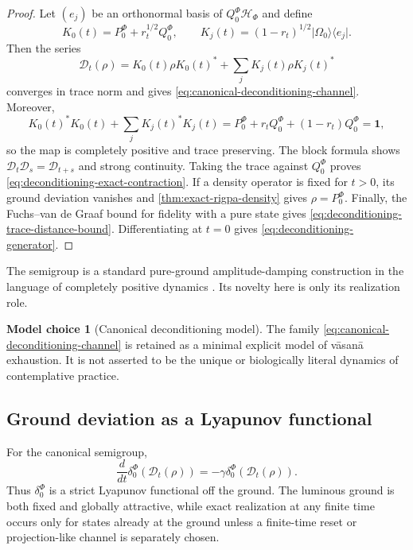 \documentclass[11pt,reqno]{scrartcl}
\newcommand{\scrHF}{\mathscr H_{\Phi}}
\newcommand{\PzeroF}{P_{0}^{\Phi}}
\newcommand{\QzeroF}{Q_{0}^{\Phi}}
\newcommand{\idop}{\mathbf 1}
\newcommand{\ket}[1]{\lvert #1\rangle}
\newcommand{\bra}[1]{\langle #1\rvert}
\theoremstyle{plain}
\theoremstyle{definition}
\newtheorem{modelchoice}[modelchoice]{Model choice}
\theoremstyle{remark}
\begin{document}
\begin{proof}
Let $(e_j)$ be an orthonormal basis of $\QzeroF\scrHF$ and define
\begin{equation}
  K_0(t)=\PzeroF+r_t^{1/2}\QzeroF,
  \qquad
  K_j(t)=(1-r_t)^{1/2}\ket{\Omega_0}\bra{e_j}.
\end{equation}
Then the series
\begin{equation}
  \mathcal D_t(\rho)
  =K_0(t)\rho K_0(t)^*
   +\sum_j K_j(t)\rho K_j(t)^*
\end{equation}
converges in trace norm and gives
\eqref{eq:canonical-deconditioning-channel}.  Moreover,
\begin{equation}
  K_0(t)^*K_0(t)+\sum_jK_j(t)^*K_j(t)
  =\PzeroF+r_t\QzeroF+(1-r_t)\QzeroF=\idop,
\end{equation}
so the map is completely positive and trace preserving.  The block formula
shows $\mathcal D_t\mathcal D_s=\mathcal D_{t+s}$ and strong continuity.
Taking the trace against $\QzeroF$ proves
\eqref{eq:deconditioning-exact-contraction}.  If a density operator is fixed
for $t>0$, its ground deviation vanishes and
\cref{thm:exact-rigpa-density} gives $\rho=\PzeroF$.  Finally, the
Fuchs--van de Graaf bound for fidelity with a pure state gives
\eqref{eq:deconditioning-trace-distance-bound}.  Differentiating at $t=0$
gives \eqref{eq:deconditioning-generator}.
\end{proof}

The semigroup is a standard pure-ground amplitude-damping construction in the
language of completely positive dynamics
\cite{GKS1976,Lindblad1976,FuchsVandeGraaf1999}.  Its novelty here is only its
realization role.

\begin{modelchoice}[Canonical deconditioning model]
\label{choice:canonical-deconditioning-model}
The family \eqref{eq:canonical-deconditioning-channel} is retained as a
minimal explicit model of v\=asan\=a exhaustion.  It is not asserted to be the
unique or biologically literal dynamics of contemplative practice.
\end{modelchoice}

\subsection{Ground deviation as a Lyapunov functional}

For the canonical semigroup,
\begin{equation}
  \frac{d}{dt}\delta_0^{\Phi}(\mathcal D_t(\rho))
  =-\gamma\delta_0^{\Phi}(\mathcal D_t(\rho)).
  \label{eq:ground-deviation-lyapunov}
\end{equation}
Thus $\delta_0^{\Phi}$ is a strict Lyapunov functional off the ground.  The
luminous ground is both fixed and globally attractive, while exact realization
at any finite time occurs only for states already at the ground unless a
finite-time reset or projection-like channel is separately chosen.
\end{document}
